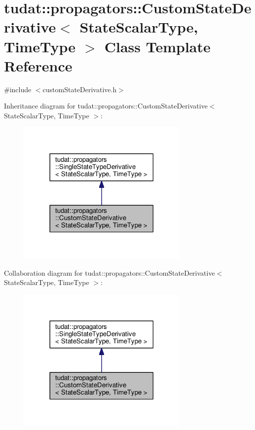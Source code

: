 \hypertarget{classtudat_1_1propagators_1_1CustomStateDerivative}{}\section{tudat\+:\+:propagators\+:\+:Custom\+State\+Derivative$<$ State\+Scalar\+Type, Time\+Type $>$ Class Template Reference}
\label{classtudat_1_1propagators_1_1CustomStateDerivative}


{\ttfamily \#include $<$custom\+State\+Derivative.\+h$>$}



Inheritance diagram for tudat\+:\+:propagators\+:\+:Custom\+State\+Derivative$<$ State\+Scalar\+Type, Time\+Type $>$\+:
\nopagebreak
\begin{figure}[H]
\begin{center}
\leavevmode
\includegraphics[width=237pt]{classtudat_1_1propagators_1_1CustomStateDerivative__inherit__graph}
\end{center}
\end{figure}


Collaboration diagram for tudat\+:\+:propagators\+:\+:Custom\+State\+Derivative$<$ State\+Scalar\+Type, Time\+Type $>$\+:
\nopagebreak
\begin{figure}[H]
\begin{center}
\leavevmode
\includegraphics[width=237pt]{classtudat_1_1propagators_1_1CustomStateDerivative__coll__graph}
\end{center}
\end{figure}
